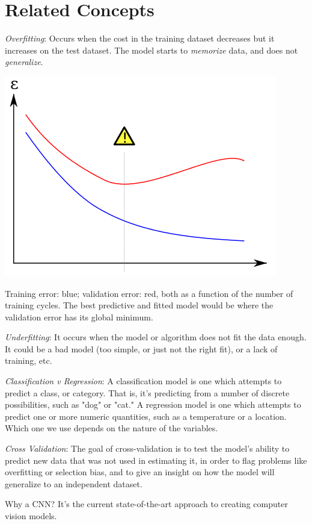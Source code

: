 \section{Related Concepts}
\textit{Overfitting}: Occurs when the cost in the training dataset decreases but it increases on the test dataset. The model starts to \textit{memorize} data, and does not \textit{generalize}.

\includegraphics[width=\textwidth]{overfitting.png}

Training error: blue; validation error: red, both as a function of the number of training cycles. The best predictive and fitted model would be where the validation error has its global minimum.

\textit{Underfitting}: It occurs when the model or algorithm does not fit the data enough. It could be a bad model (too simple, or just not the right fit), or a lack of training, etc.

\textit{Classification v Regression}: A classification model is one which attempts to predict a class, or category. That is, it's predicting from a number of discrete possibilities, such as "dog" or "cat." A regression model is one which attempts to predict one or more numeric quantities, such as a temperature or a location. Which one we use depends on the nature of the variables.

\textit{Cross Validation}: The goal of cross-validation is to test the model's ability to predict new data that was not used in estimating it, in order to flag problems like overfitting or selection bias, and to give an insight on how the model will generalize to an independent dataset.

Why a CNN? It's the current state-of-the-art approach to creating computer vision models.

